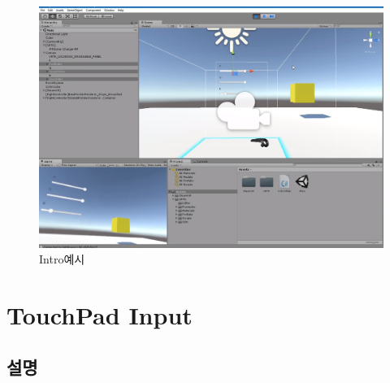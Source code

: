 \documentclass{report}
\begin{document}
    \begin{figure}[h!]
    \centering
    \includegraphics[width=1.0\textwidth]{vrtk1-1.jpg}
    \caption{Intro예시}
    \end{figure}
    
    \section{TouchPad Input}
    \subsection{설명}
    
\end{document}
